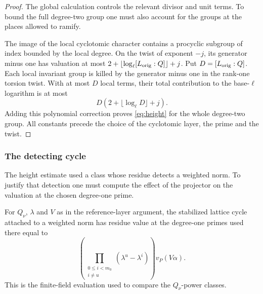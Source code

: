 \begin{proof}
The global calculation controls the relevant divisor and unit terms. To bound the full degree-two group one must also account for the groups at the places allowed to ramify.


The image of the local cyclotomic character contains
a procyclic subgroup of index bounded by the local
degree. On the twist of exponent \(-j\), its generator
minus one has valuation at most
\(2+\lfloor\log_\ell[L_{\rm orig}:Q]\rfloor+j\).
Put \(D=[L_{\rm orig}:Q]\). Each local invariant group is killed by the generator minus one in the rank-one torsion twist. With at most \(D\) local terms, their total contribution to the base-\(\ell\) logarithm is at most
\[
       D(2+\lfloor\log_\ell D\rfloor+j).
\]
Adding this polynomial correction proves
\eqref{eq:height} for the whole degree-two group.
All constants precede the choice of the cyclotomic
layer, the prime and the twist.

\end{proof}

\subsubsection{The detecting cycle}

The height estimate used a class whose residue detects a weighted norm. To justify that detection one must compute the effect of the projector on the valuation at the chosen degree-one prime.

\begin{proposition}\label{prop:detecting-cycle-residue}
For \(Q_\nu\), \(\lambda\) and \(V\) as in the reference-layer
argument, the stabilized lattice cycle attached to a weighted norm
has residue value at the degree-one primes used there equal to
\[
 \left(\prod_{\substack{0\le i<m_0\\i\ne u}}
                  (\lambda^u-\lambda^i)\right)v_P(V\alpha).
\]
This is the finite-field evaluation used to compare the
\(Q_\nu\)-power classes.
\end{proposition}

